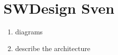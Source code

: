 \section{SWDesign Sven}
\begin{enumerate}
    \item diagrams
    \item describe the architecture
\end{enumerate}

